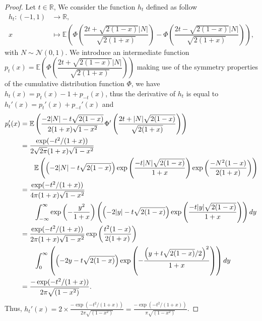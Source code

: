 \documentclass[12pt]{article}
\theoremstyle{Theorem}
\theoremstyle{definition}
\begin{document}
\begin{proof}
Let $t \in \mathbb{R}$, We consider the function $h_{t}$ defined as follow \begin{align*} 
h_{t}: (-1,1) &\longrightarrow \mathbb{R}, \\
x & \longmapsto \mathbb{E}\left(\Phi\left(\dfrac{2t + \sqrt{2(1-x)}|N|}{\sqrt{2(1+x)}}\right) - \Phi\left(\dfrac{2t - \sqrt{2(1-x)}|N|}{\sqrt{2(1+x)}}\right)\right),
\end{align*}
with $N \sim \mathcal{N}\left(0,1\right)$. We introduce an intermediate function $p_{t}(x) = \mathbb{E}\left(\Phi\left(\dfrac{2t + \sqrt{2(1-x)}|N|}{\sqrt{2(1+x)}}\right)\right)$ making use of the symmetry properties of the cumulative distribution function $\Phi$, \linebreak we have $h_{t}(x) =p_{t}(x) - 1 + p_{-t}(x)$, thus the derivative of $h_{t}$ is equal to $h_{t}'(x) = p_{t}'(x) + p_{-t}'(x)$ and 
\begin{align*}p_{t}'(x) & = \mathbb{E}\left(\frac{-2|N| -t\sqrt{2(1-x)}}{2(1+x)\sqrt{1-x^2}}\Phi'\left(\frac{2t + |N|\sqrt{2(1-x)}}{\sqrt{2(1+x)}}\right)\right)\\
& = \frac{\exp(-t^2/(1+x))}{2\sqrt{2\pi}(1+x)\sqrt{1-x^2}}\\
& \hspace{0.7cm}\mathbb{E}\left(\left(-2|N| -t\sqrt{2(1-x)}\right)\exp\left(\frac{-t|N|\sqrt{2(1-x)}}{1+x}\right)\exp\left(\frac{-N^{2}(1-x)}{2(1+x)}\right)\right) \\
& = \frac{\exp(-t^2/(1+x))}{4\pi(1+x)\sqrt{1-x^2}} \\
& \hspace{0.7cm} \int_{-\infty}^{\infty}\exp\left(-\frac{y^2}{1+x}\right)\left(\left(-2|y| -t\sqrt{2(1-x)}\right)\exp\left(\frac{-t|y|\sqrt{2(1-x)}}{1+x}\right)\right)dy\\
& = \frac{\exp(-t^2/(1+x))}{2\pi(1+x)\sqrt{1-x^2}}\exp\left(\frac{t^2(1-x)}{2(1+x)}\right) \\
& \hspace{0.7cm} \int_{0}^{\infty}\left(\left(-2y -t\sqrt{2(1-x)}\right)\exp\left(-\frac{\left(y+t\sqrt{2(1-x)}/2\right)^{2}}{1+x}\right)\right)dy \\
& = \frac{-\exp(-t^2/(1+x))}{2\pi\sqrt{(1-x^2)}}.
\end{align*}Thus, $h_{t}'(x) = 2 \times \frac{-\exp(-t^2/(1+x))}{2\pi\sqrt{(1-x^2)}} = \frac{-\exp(-t^2/(1+x))}{\pi\sqrt{(1-x^2)}}$.

\end{proof}
\end{document}
